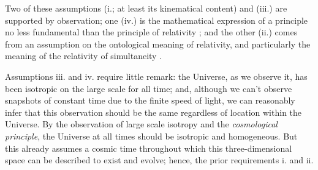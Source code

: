 \documentclass[12 pt]{article}
\begin{document}
Two of these assumptions (i.; at least its kinematical content) and (iii.) are supported by observation; one (iv.) is the mathematical expression of a principle no less fundamental than the principle of relativity \citep[\S\,I.2]{Einstein1905}; and the other (ii.) comes from an assumption on the ontological meaning of relativity, and particularly the meaning of the relativity of simultaneity \citep[\S\,I.1]{Einstein1905}.

Assumptions iii. and iv. require little remark: the Universe, as we observe it, has been isotropic on the large scale for all time; and, although we can't observe snapshots of constant time due to the finite speed of light, we can reasonably infer that this observation should be the same regardless of location within the Universe. By the observation of large scale isotropy and the \textit{cosmological principle}, the Universe at all times should be isotropic and homogeneous. But this already assumes a cosmic time throughout which this three-dimensional space can be described to exist and evolve; hence, the prior requirements i. and ii.
\end{document}
